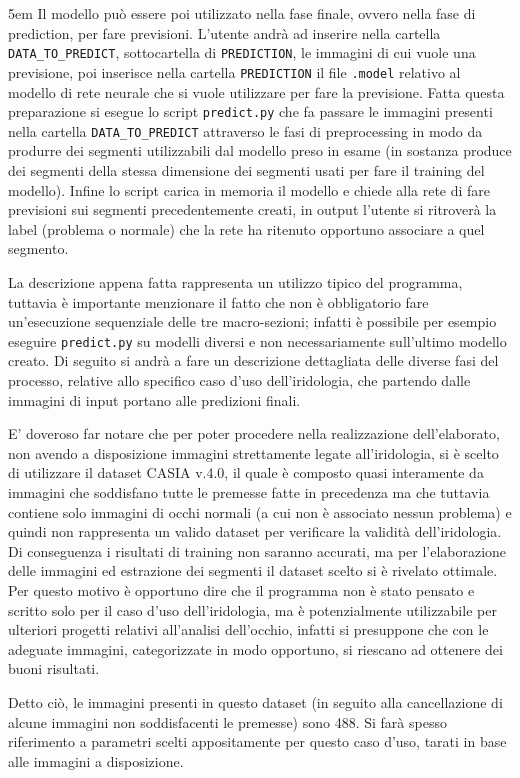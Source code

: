 \emergencystretch 5em%
Il modello può essere poi utilizzato nella fase finale, ovvero nella fase di prediction, per fare previsioni. L’utente andrà ad inserire nella cartella \texttt{DATA\_TO\_PREDICT}, sottocartella di \texttt{PREDICTION}, le immagini di cui vuole una previsione, poi inserisce nella cartella \texttt{PREDICTION} il file \texttt{.model} relativo al modello di rete neurale che si vuole utilizzare per fare la previsione. Fatta questa preparazione si esegue lo script \texttt{predict.py} che fa passare le immagini presenti nella cartella \texttt{DATA\_TO\_PREDICT} attraverso le fasi di preprocessing in modo da produrre dei segmenti utilizzabili dal modello preso in esame (in sostanza produce dei segmenti della stessa dimensione dei segmenti usati per fare il training del modello). Infine lo script carica in memoria il modello e chiede alla rete di fare previsioni sui segmenti precedentemente creati, in output l’utente si ritroverà la label (problema o normale) che la rete ha ritenuto opportuno associare a quel segmento. 

La descrizione appena fatta rappresenta un utilizzo tipico del programma, tuttavia è importante menzionare il fatto che non è obbligatorio fare un’esecuzione sequenziale delle tre macro-sezioni; infatti è possibile per esempio eseguire \texttt{predict.py} su modelli diversi e non necessariamente sull’ultimo modello creato. Di seguito si andrà a fare un descrizione dettagliata delle diverse fasi del processo, relative allo specifico caso d’uso dell’iridologia, che partendo dalle immagini di input portano alle predizioni finali. 

E’ doveroso far notare che per poter procedere nella realizzazione dell’elaborato, non avendo a disposizione immagini strettamente legate all’iridologia, si è scelto di utilizzare il dataset CASIA v.4.0, il quale è composto quasi interamente da immagini che soddisfano tutte le premesse fatte in precedenza ma che tuttavia contiene solo immagini di occhi normali (a cui non è associato nessun problema) e quindi non rappresenta un valido dataset per verificare la validità dell’iridologia. Di conseguenza i risultati di training non saranno accurati, ma per l’elaborazione delle immagini ed estrazione dei segmenti il dataset scelto si è rivelato ottimale. Per questo motivo è opportuno dire che il programma non è stato pensato e scritto solo per il caso d’uso dell’iridologia, ma è potenzialmente utilizzabile per ulteriori progetti relativi all’analisi dell’occhio, infatti si presuppone che con le adeguate immagini, categorizzate in modo opportuno, si riescano ad ottenere dei buoni risultati. 

Detto ciò, le immagini presenti in questo dataset (in seguito alla cancellazione di alcune immagini non soddisfacenti le premesse) sono 488. Si farà spesso riferimento a parametri scelti appositamente per questo caso d’uso, tarati in base alle immagini a disposizione.
